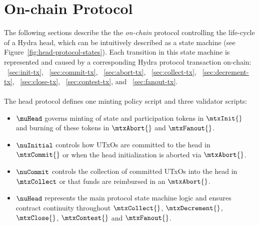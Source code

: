 \clearpage
\section{On-chain Protocol}\label{sec:on-chain}


\noindent The following sections describe the the \emph{on-chain} protocol
controlling the life-cycle of a Hydra head, which can be intuitively described
as a state machine (see Figure~\ref{fig:head-protocol-states}). Each transition
in this state machine is represented and caused by a corresponding Hydra
protocol transaction
on-chain: \mtxInit{}~\ref{sec:init-tx}, \mtxCom{}~\ref{sec:commit-tx}, \mtxAbort{}~\ref{sec:abort-tx}, \mtxCollect{}~\ref{sec:collect-tx}, \red{\mtxIncrement{}~\ref{sec:increment-tx},} \mtxDecrement{}~\ref{sec:decrement-tx}, \mtxClose{}~\ref{sec:close-tx}, \mtxContest{}~\ref{sec:contest-tx}, and \mtxFanout{}~\ref{sec:fanout-tx}. \\

\noindent {} \\


\noindent The head protocol defines one minting policy script and three
validator scripts:
\begin{itemize}
  \item $\muHead$ governs minting of state and participation tokens in
  $\mtxInit{}$ and burning of these tokens in $\mtxAbort{}$ and
  $\mtxFanout{}$.
  \item $\nuInitial$ controls how UTxOs are committed to the head in
  $\mtxCommit{}$ or when the head initialization is aborted via
  $\mtxAbort{}$.
  \item $\nuCommit$ controls the collection of committed UTxOs into the head in
  $\mtxCollect$ or that funds are reimbursed in an $\mtxAbort{}$.
  \item $\nuHead$ represents the main protocol state machine logic and ensures
  contract continuity throughout $\mtxCollect{}$, $\mtxDecrement{}$,
  \red{\mtxIncrement{},} $\mtxClose{}$, $\mtxContest{}$ and
  $\mtxFanout{}$.
\end{itemize}

